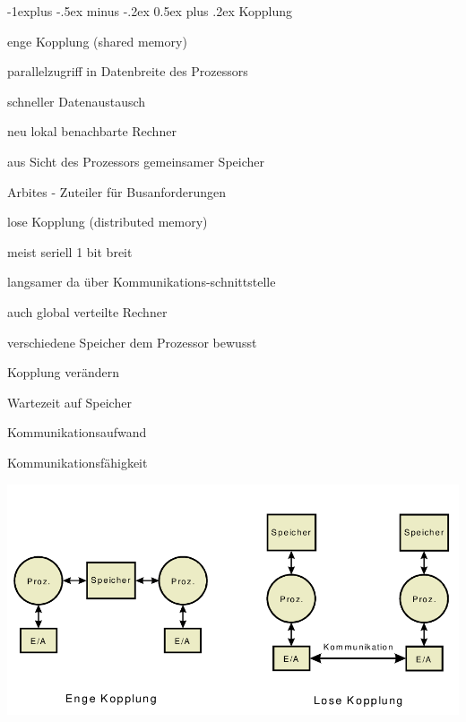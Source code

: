 \documentclass[a4paper]{article}
\makeatletter
\renewcommand{\subsection}{\@startsection{subsection}{2}{0mm}%
                                {-1explus -.5ex minus -.2ex}%
                                {0.5ex plus .2ex}%
                                {\normalfont\normalsize\bfseries}}
\makeatother
\begin{document}
\begin{multicols}{3}
  
  \subsection{Kopplung}
  \begin{description*}
    \item[enge Kopplung] (shared memory)
    \begin{itemize*}
      \item parallelzugriff in Datenbreite des Prozessors
      \item schneller Datenaustausch 
      \item neu lokal benachbarte Rechner
      \item aus Sicht des Prozessors gemeinsamer Speicher
      \item Arbites - Zuteiler für Busanforderungen
    \end{itemize*}
    \item[lose Kopplung] (distributed memory)
    \begin{itemize*}
      \item meist seriell 1 bit breit
      \item langsamer da über Kommunikations-schnittstelle
      \item auch global verteilte Rechner
      \item verschiedene Speicher dem Prozessor bewusst
    \end{itemize*}
    \item[Kopplung] verändern
    \begin{itemize*}
      \item Wartezeit auf Speicher
      \item Kommunikationsaufwand
      \item Kommunikationsfähigkeit
    \end{itemize*}
  \end{description*}
  \begin{center}
    \includegraphics[width=\textwidth/7]{Assets/RA2_Enge und lose Kopplung.png}

\end{center}
\end{multicols}
\end{document}
